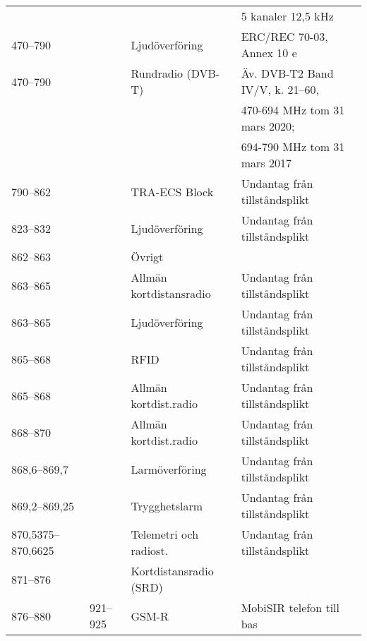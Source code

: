 \begin{landscape}
\begin{landscape}
\begin{longtable}{llll}
	                   &                    &                         & 5 kanaler 12,5 kHz                    \\
	470--790           &                    & Ljudöverföring          & ERC/REC 70-03, Annex 10 e             \\
	470--790           &                    & Rundradio (DVB-T)       & Äv. DVB-T2 Band IV/V, k. 21--60,      \\
	                   &                    &                         & 470-694 MHz tom 31 mars 2020;         \\
	                   &                    &                         & 694-790 MHz tom 31 mars 2017          \\
	790--862           &                    & TRA-ECS	Block     & Undantag från tillståndsplikt         \\
	823--832           &                    & Ljudöverföring          & Undantag från tillståndsplikt         \\
	862--863           &                    & Övrigt                  &                                       \\
	863--865           &                    & Allmän kortdistansradio & Undantag från tillståndsplikt         \\
	863--865           &                    & Ljudöverföring          & Undantag från tillståndsplikt         \\
	865--868           &                    & RFID                    & Undantag från tillståndsplikt         \\
	865--868           &                    & Allmän kortdist.radio   & Undantag från tillståndsplikt         \\
	868--870           &                    & Allmän kortdist.radio   & Undantag från tillståndsplikt         \\
	868,6--869,7       &                    & Larmöverföring          & Undantag från tillståndsplikt         \\
	869,2--869,25      &                    & Trygghetslarm           & Undantag från tillståndsplikt         \\
	870,5375--870,6625 &                    & Telemetri och radiost.  & Undantag från tillståndsplikt         \\
	871--876           &                    & Kortdistansradio (SRD)  &                                       \\
	876--880           & 921--925           & GSM-R                   & MobiSIR telefon till bas              \\

\end{longtable}
\end{landscape}
\end{landscape}
